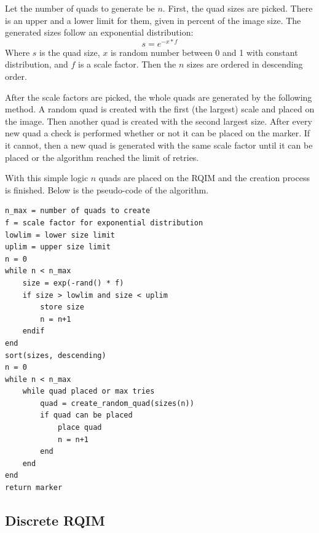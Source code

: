 Let the number of quads to generate be $n$.
First, the quad sizes are picked.
There is an upper and a lower limit for them, given in percent of the image size.
The generated sizes follow an exponential distribution:
\begin{equation}
	s = e^{-x*f}
\end{equation}
Where $s$ is the quad size, $x$ is random number between 0 and 1 with constant distribution, and $f$ is a scale factor.
Then the $n$ sizes are ordered in descending order.

After the scale factors are picked, the whole quads are generated by the following method.
A random quad is created with the first (the largest) scale and placed on the image.
Then another quad is created with the second largest size.
After every new quad a check is performed whether or not it can be placed on the marker.
If it cannot, then a new quad is generated with the same scale factor until it can be placed or the algorithm reached the limit of retries.

With this simple logic $n$ quads are placed on the RQIM and the creation process is finished.
Below is the pseudo-code of the algorithm.

\begin{lstlisting}
n_max = number of quads to create
f = scale factor for exponential distribution
lowlim = lower size limit
uplim = upper size limit
n = 0
while n < n_max
	size = exp(-rand() * f)
	if size > lowlim and size < uplim
		store size
		n = n+1
	endif
end
sort(sizes, descending)
n = 0
while n < n_max
	while quad placed or max tries
		quad = create_random_quad(sizes(n))
		if quad can be placed
			place quad
			n = n+1
		end
	end
end
return marker
\end{lstlisting}

\subsection{Discrete RQIM}
